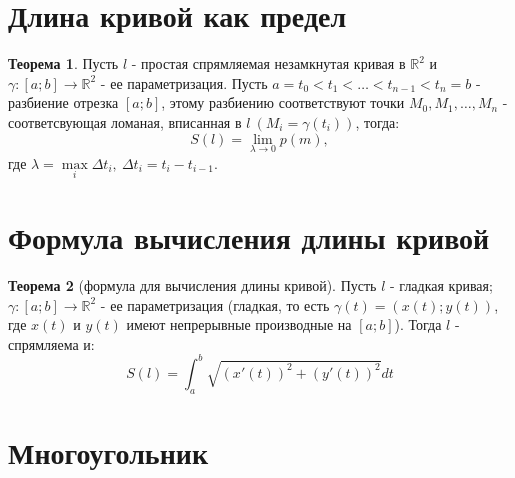 \documentclass{report}
\theoremstyle{definition}
\newtheorem*{theorem}{Теорема}
\begin{document}
\section{Длина кривой как предел}

\begin{theorem}
    Пусть $l$ - простая спрямляемая незамкнутая кривая в $\mathbb{R}^2$ и $\gamma:[a;b]\rightarrow\mathbb{R}^2$
    - ее параметризация. Пусть $a = t_0 < t_1 < \ldots < t_{n-1} < t_n = b$ - разбиение отрезка $[a;b]$,
    этому разбиению соответствуют точки $M_0,M_1,\ldots,M_n$ - соответсвующая ломаная, вписанная в $l \
        (M_i = \gamma(t_i))$, тогда:
    \begin{equation*}
        S(l) = \underset{\lambda\rightarrow0}{\lim}p(m),
    \end{equation*}
    где $\lambda = \underset{i}{\max}\Delta t_i, \ \Delta t_i = t_i - t_{i-1}$.
\end{theorem}

\section{Формула вычисления длины кривой}

\begin{theorem}[формула для вычисления длины кривой]
    Пусть $l$ - гладкая кривая; $\gamma:[a;b]\rightarrow\mathbb{R}^2$ - ее параметризация (гладкая,
    то есть $\gamma(t) = (x(t);y(t))$, где $x(t)$ и $y(t)$ имеют непрерывные производные на $[a;b]$).
    Тогда $l$ - спрямляема и:
    \begin{equation*}
        S(l) = \int_{a}^{b}\sqrt{(x'(t))^2 + (y'(t))^2}dt
    \end{equation*}
\end{theorem}

\section{Многоугольник}
\end{document}
